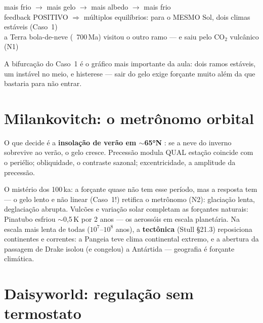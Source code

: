 \documentclass[11pt]{article}
\begin{document}
\begin{noquadro}
mais frio $\to$ mais gelo $\to$ mais albedo $\to$ mais frio\\
feedback POSITIVO $\Rightarrow$ múltiplos equilíbrios: para o MESMO
Sol, dois climas estáveis (Caso~1)\\[2pt]
a Terra bola-de-neve (~700\,Ma) visitou o outro ramo — e saiu pelo
CO$_2$ vulcânico (N1)
\end{noquadro}

A bifurcação do Caso~1 é o gráfico mais importante da aula: dois
ramos estáveis, um instável no meio, e histerese — sair do gelo exige
forçante muito além da que bastaria para não entrar.

\section{Milankovitch: o metrônomo orbital}\label{sec:milan}


\begin{formalivro}
O que decide é a \textbf{insolação de verão em $\sim$65°N}
: se a neve do inverno sobrevive
ao verão, o gelo cresce. Precessão modula QUAL estação coincide com o
periélio; obliquidade, o contraste sazonal; excentricidade, a
amplitude da precessão.
\end{formalivro}

O mistério dos 100\,ka: a forçante quase não tem esse período, mas a
resposta tem — o gelo lento e não linear (Caso~1!) retifica o
metrônomo (N2): glaciação lenta, deglaciação abrupta. Vulcões e
variação solar completam as forçantes naturais: Pinatubo esfriou
$\sim$0,5\,K por 2 anos — os aerossóis  em
escala planetária. Na escala mais lenta de todas ($10^7$--$10^8$
anos), a \textbf{tectônica} (Stull \S21.3) reposiciona continentes e
correntes: a Pangeia teve clima continental extremo, e a abertura da
passagem de Drake isolou (e congelou) a Antártida — geografia é
forçante climática.

\section{Daisyworld: regulação sem termostato}\label{sec:daisy}
\end{document}
